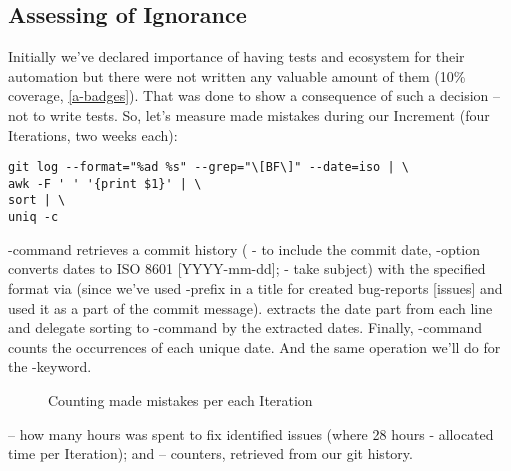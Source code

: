 \subsection{Assessing of Ignorance} \label{ut-fail}

Initially we've declared importance of having tests and ecosystem for their automation but there were not written any 
valuable amount of them (10\% coverage, \ref{a-badges}). That was done to show a consequence of such a decision -- not 
to write tests. So, let's measure made mistakes during our Increment (four Iterations, two weeks each):

\begin{lstlisting}[language=terminal]
git log --format="%ad %s" --grep="\[BF\]" --date=iso | \
awk -F ' ' '{print $1}' | \
sort | \
uniq -c
\end{lstlisting}

\noindent {}-command retrieves a commit history ( - to include the commit date, -option 
converts dates to ISO 8601 [YYYY-mm-dd];  - take subject) with the specified format via  (since we've 
used \q{[BF]}-prefix in a title for created bug-reports [issues] and used it as a part of the commit message). \q{awk} 
extracts the date part from each line and delegate sorting to \q{sort}-command by the extracted dates. Finally, 
\q{uniq -c}-command counts the occurrences of each unique date. And the same operation we'll do for the \q{fix}-keyword.

\begin{figure}[h]
  \begin{center}
  \end{center}
  \caption{Counting made mistakes per each Iteration}\label{im-errors}
\end{figure}

\noindent {} -- how many hours was spent to fix identified issues (where 28 hours - allocated time per Iteration);
 and  -- counters, retrieved from our git history.\\
\\

